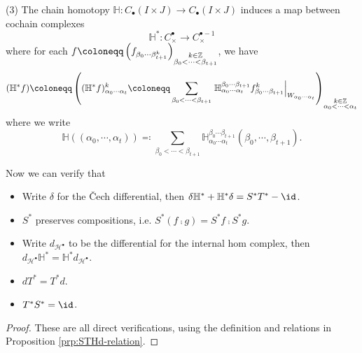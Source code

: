 \begin{dfn}
\noindent
(3)
The chain homotopy
$
\mathbb{H}:
C_{\bullet}(I\times J)
\rightarrow
C_{\bullet}(I\times J)
$
induces a map between cochain complexes
$$
\mathbb{H}^{\ast}\colon C_{\times}^{\bullet}\to C_{\times}^{\bullet -1}
$$where for each $f\coloneqq\left(f_{\beta_0\dotsb\beta_{t+1}^k}\right)_
{
    \begin{subarray}{c}
        k\in\mathbb{Z}\\ 
        \beta_0<\dotsb<\beta_{t+1}
    \end{subarray}
    }$, we have$$
(\mathbb{H}^{\ast} f)\coloneqq\left((\mathbb{H}^{\ast} f)^k_{\alpha_0\dotsb\alpha_t}\coloneqq\sum_{\beta_0<\dotsb<\beta_{t+1}}\left. \mathbb{H}_{\alpha_0\dotsb\alpha_t}^{\beta_0\dotsb\beta_{t+1}} f_{\beta_0\dotsb\beta_{t+1}}^k\right|_{W_{\alpha_0\dotsb\alpha_t}}\right)
_{
    \begin{subarray}{c}
        k\in\mathbb{Z}\\ 
        \alpha_0<\dotsb<\alpha_t
    \end{subarray}
}
$$where we write \[
    \mathbb{H}((\alpha_0,\dotsb,\alpha_t))\eqqcolon\sum_{\beta_0<\dotsb<\beta_{t+1}}\mathbb{H}_{\alpha_0\dotsb\alpha_t}^{\beta_0\dotsb\beta_{t+1}} (\beta_0,\dotsb ,\beta_{t+1}).
\]
\end{dfn}
Now we can verify that
\begin{prp}\label{prp:STHd-relation}
    \begin{itemize}
        \item Write $\delta$ for the \v{C}ech differential, then $\delta\mathbb{H}^{\ast} +\mathbb{H}^{\ast} \delta=S^{\ast} T^{\ast} -\id$.
        \item $S^{\ast}$ preserves compositions, i.e. $S^{\ast} (f\comp g)=S^{\ast} f\comp S^{\ast} g$.
        \item Write $d_{\mathcal{H}^{\bullet}}$ to be the differential for the internal hom complex, then $d_{\mathcal{H}^{\bullet}}\mathbb{H}^{\ast} =\mathbb{H}^{\ast}d_{\mathcal{H}^{\bullet}}$.
        \item $dT^{\ast} =T^{\ast} d$.
        \item $T^{\ast} S^{\ast} =\id$.
    \end{itemize}
\end{prp}
\begin{proof}
    These are all direct verifications, using the definition and relations in Proposition \ref{prp:STHd-relation}.
\end{proof}



